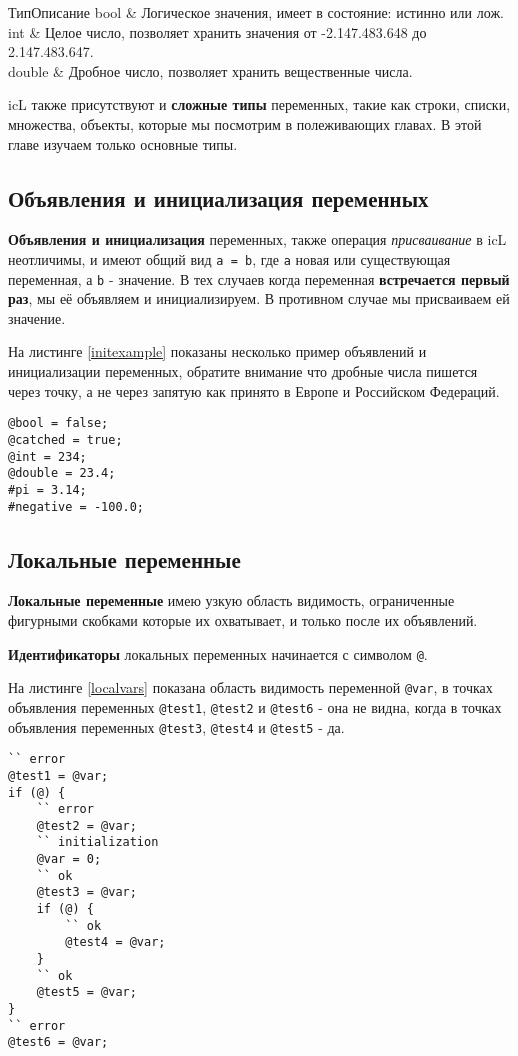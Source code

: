 \documentclass[a4paper, 14pt]{extarticle}
\begin{document}
%
	{Тип}{Описание}%
	{ 
	bool & Логическое значения, имеет в состояние: истинно или лож. \\ \hline
	int & Целое число, позволяет хранить значения от -2.147.483.648 до 2.147.483.647. \\ \hline
	double & Дробное число, позволяет хранить вещественные числа. \\
	}
	
	icL также присутствуют и \textbf{сложные типы} переменных, такие как строки, списки, множества, объекты, которые мы посмотрим в полеживающих главах. В этой главе изучаем только основные типы.
	
\subsection{Объявления и инициализация переменных}
	
	\textbf{Объявления и инициализация} переменных, также операция \textit{присваивание} в icL неотличимы, и имеют общий вид \lstinline`a = b`, где \lstinline`a` новая или существующая переменная, а \lstinline`b` - значение. В тех случаев когда переменная \textbf{встречается первый раз}, мы её объявляем и инициализируем. В противном случае мы присваиваем ей значение.
	
	На листинге \ref{initexample} показаны несколько пример объявлений и инициализации переменных, обратите внимание что дробные числа пишется через точку, а не через запятую как принято в Европе и Российском Федераций.
  	
\begin{lstlisting}[caption=Пример объявлений и инициализации переменных,label=initexample]
@bool = false;
@catched = true;
@int = 234;
@double = 23.4;
#pi = 3.14;
#negative = -100.0;
\end{lstlisting}

\subsection{Локальные переменные}
	
	\textbf{Локальные переменные} имею узкую область видимость, ограниченные фигурными скобками которые их охватывает, и только после их объявлений. 
	
	{\bf Идентификаторы} локальных переменных начинается с символом \lstinline`@`. 
	
	На листинге \ref{localvars} показана область видимость переменной \lstinline`@var`, в точках объявления переменных \lstinline`@test1`, \lstinline`@test2` и \lstinline`@test6` - она не видна, когда в точках объявления переменных \lstinline`@test3`, \lstinline`@test4` и \lstinline`@test5` - да.
\begin{lstlisting}[caption=Область видимости локальных перемен, label=localvars]
`` error
@test1 = @var;
if (@) {
	`` error
	@test2 = @var; 
	`` initialization
	@var = 0;
	`` ok
	@test3 = @var;
	if (@) {
		`` ok
		@test4 = @var;
	}
	`` ok
	@test5 = @var; 
}
`` error
@test6 = @var; 
\end{lstlisting}
\end{document}
